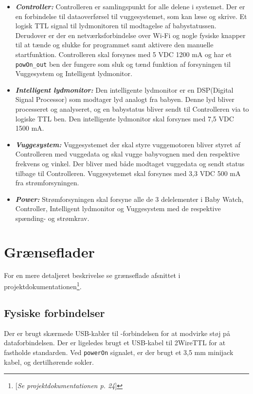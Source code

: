 
\begin{itemize}
\item \textbf{\textit{Controller:}}
Controlleren er samlingspunkt for alle delene i systemet. Der er en \iic forbindelse til dataoverførsel til vuggesystemet, som kan læse og skrive. Et logisk TTL signal til lydmonitoren til modtagelse af babystatussen. Derudover er der en netværksforbindelse over Wi-Fi og nogle fysiske knapper til at tænde og slukke for programmet samt aktivere den manuelle startfunktion. Controlleren skal forsynes med 5 VDC 1200 mA og har et \verb+powOn_out+ ben der fungere som sluk og tænd funktion af forsyningen til Vuggesystem og Intelligent lydmonitor.
\item \textbf{\textit{Intelligent lydmonitor:}}
Den intelligente lydmonitor er en DSP(Digital Signal Processor) som modtager lyd analogt fra babyen. Denne lyd bliver processeret og analyseret, og en babystatus bliver sendt til Controlleren via to logiske TTL ben. Den intelligente lydmonitor skal forsynes med 7,5 VDC 1500 mA.
\item \textbf{\textit{Vuggesystem:}}
Vuggesystemet der skal styre vuggemotoren bliver styret af Controlleren med vuggedata og skal vugge babyvognen med den respektive frekvens og vinkel. Der bliver med \iic både modtaget vuggedata og sendt status tilbage til Controlleren. Vuggesystemet skal forsynes med 3,3 VDC 500 mA fra strømforsyningen.
\item \textbf{\textit{Power:}}
Strømforsyningen skal forsyne alle de 3 delelementer i Baby Watch, Controller, Intelligent lydmonitor og Vuggesystem med de respektive spænding- og strømkrav.
\end{itemize}

\section{Grænseflader}

For en mere detaljeret beskrivelse se grænseflade afsnittet i projektdokumentationen\footnote{[\textit{Se projektdokumentationen p. 24}]}.

\subsection{Fysiske forbindelser}

Der er brugt skærmede USB-kabler til \iic-forbindelsen for at modvirke støj på dataforbindelsen. Der er ligeledes brugt et USB-kabel til 2WireTTL for at fastholde standarden. Ved \verb+powerOn+ signalet, er der brugt et 3,5 mm minijack kabel, og dertilhørende sokler.

